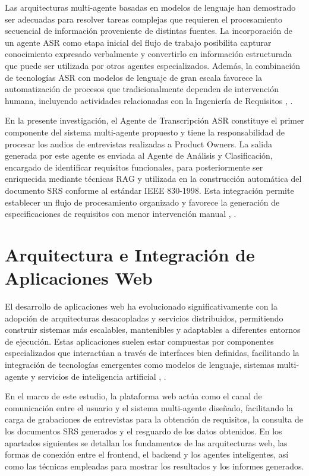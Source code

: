 Las arquitecturas multi-agente basadas en modelos de lenguaje han demostrado ser adecuadas para resolver tareas complejas que requieren el 
procesamiento secuencial de información proveniente de distintas fuentes. La incorporación de un agente ASR como etapa inicial del flujo de 
trabajo posibilita capturar conocimiento expresado verbalmente y convertirlo en información estructurada que puede ser utilizada por otros agentes 
especializados. Además, la combinación de tecnologías ASR con modelos de lenguaje de gran escala favorece la automatización de procesos que 
tradicionalmente dependen de intervención humana, incluyendo actividades relacionadas con la Ingeniería de Requisitos \cite{Guo2024}, \cite{Umar2024}.

En la presente investigación, el Agente de Transcripción ASR constituye el primer componente del sistema multi-agente propuesto y tiene la 
responsabilidad de procesar los audios de entrevistas realizadas a Product Owners. La salida generada por este agente es enviada al Agente 
de Análisis y Clasificación, encargado de identificar requisitos funcionales, para posteriormente ser enriquecida mediante técnicas RAG y utilizada 
en la construcción automática del documento SRS conforme al estándar IEEE 830-1998. Esta integración permite establecer un flujo de procesamiento 
organizado y favorece la generación de especificaciones de requisitos con menor intervención manual \cite{Radford2022}, \cite{Wolf2026}.



\section{Arquitectura e Integración de Aplicaciones Web}

El desarrollo de aplicaciones web ha evolucionado significativamente con la adopción de arquitecturas desacopladas y servicios distribuidos, 
permitiendo construir sistemas más escalables, mantenibles y adaptables a diferentes entornos de ejecución. Estas aplicaciones suelen estar 
compuestas por componentes especializados que interactúan a través de interfaces bien definidas, facilitando la integración de tecnologías 
emergentes como modelos de lenguaje, sistemas multi-agente y servicios de inteligencia artificial \cite{richards2020fundamentals}, \cite{newman2021building}.

En el marco de este estudio, la plataforma web actúa como el canal de comunicación entre el usuario y el sistema multi-agente diseñado, 
facilitando la carga de grabaciones de entrevistas para la obtención de requisitos, la consulta de los documentos SRS generados y el resguardo 
de los datos obtenidos. En los apartados siguientes se detallan los fundamentos de las arquitecturas web, las formas de conexión entre el frontend, 
el backend y los agentes inteligentes, así como las técnicas empleadas para mostrar los resultados y los informes generados.



